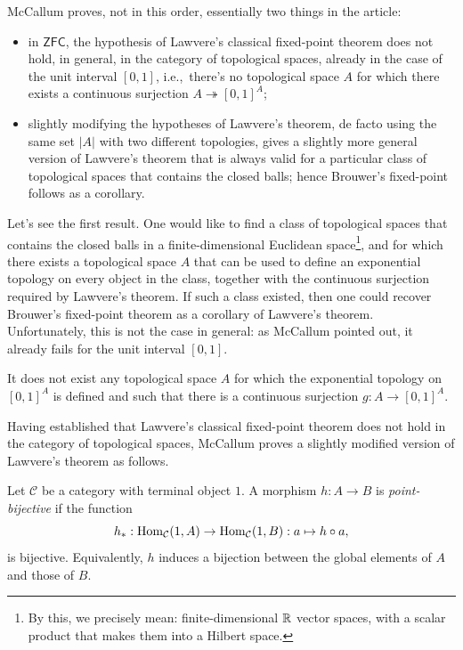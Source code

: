 McCallum proves, not in this order, essentially two things in the article:
\begin{itemize}
    \item in $\mathsf{ZFC}$, the hypothesis of Lawvere's classical fixed-point theorem does not hold, in general, in the category of topological spaces, already in the case of the unit interval $[0,1]$, i.e.,\ there's no topological space $A$ for which
    there exists a continuous surjection $A \twoheadrightarrow [0,1]^A$;
    \item slightly modifying the hypotheses of Lawvere's theorem, de facto using the same set $|A|$ with two different topologies, gives a slightly more general version of Lawvere's theorem that is always valid for
    a particular class of topological spaces that contains the closed balls; hence Brouwer's fixed-point follows as a corollary.
\end{itemize}

Let's see the first result. One would like to find a class of topological spaces that contains the closed balls in a finite-dimensional Euclidean space\footnote{By this, we precisely mean: finite-dimensional $\mathbb{R}$ vector spaces, with a scalar product that makes them into a Hilbert space.},
and for which there exists a topological space $A$ that can be used to define an exponential topology on every object in the class, together with the continuous surjection required by Lawvere's theorem. If such
a class existed, then one could recover Brouwer's fixed-point theorem as a corollary of Lawvere's theorem. Unfortunately, this is not the case in general: as McCallum pointed out, it already fails for the unit interval $[0,1]$.

\begin{fact}
    It does not exist any topological space $A$ for which the exponential topology on $[0,1]^A$ is defined
    and such that there is a continuous surjection $g : A \to [0,1]^A$.
\end{fact}

Having established that Lawvere's classical fixed-point theorem does not hold in the category of topological spaces, McCallum proves a slightly modified version of Lawvere's theorem as follows.

\begin{definition}
    Let $\mathcal C$ be a category with terminal object $1$. A morphism $h:A\to B$ is \emph{point-bijective} if the function
    \[ h_*:\operatorname{Hom}_{\mathcal C}(1,A)\to\operatorname{Hom}_{\mathcal C}(1,B) : a\mapsto h\circ a, \]
    is bijective. Equivalently, $h$ induces a bijection between the global elements of $A$ and those of $B$.
\end{definition}

